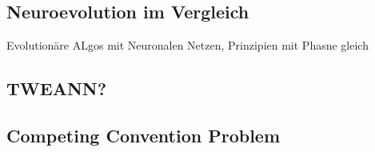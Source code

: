 



\subsection{Neuroevolution im Vergleich}
Evolutionäre ALgos mit Neuronalen Netzen, Prinzipien mit Phasne gleich


\subsection{TWEANN?}
\label{subsec:tweann}
\subsection{Competing Convention Problem}
\label{subsec:competing_convention_problem}

